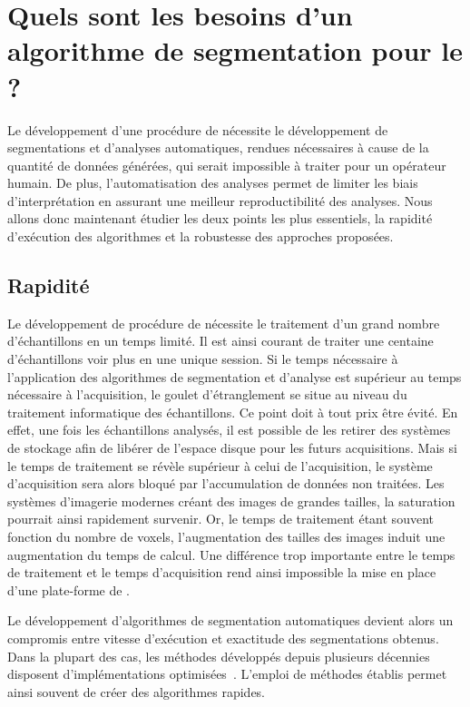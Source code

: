 \documentclass[\main/main.tex]{subfiles}
\begin{document}
            
\section{Quels sont les besoins d'un algorithme de segmentation pour le \hcs{}?}

%
Le développement d'une procédure de \hcs{} nécessite le développement de segmentations et d'analyses automatiques, rendues nécessaires à cause de la quantité de données générées, qui serait impossible à traiter pour un opérateur humain.
%
De plus, l'automatisation des analyses permet de limiter les biais d'interprétation en assurant une meilleur reproductibilité des analyses.
%
Nous allons donc maintenant étudier les deux points les plus essentiels,
la rapidité d'exécution des algorithmes et la robustesse des approches proposées.

    \subsection{Rapidité}
    
%
Le développement de procédure de \hcs{} nécessite le traitement d'un grand nombre d'échantillons en un temps limité.
%
Il est ainsi courant de traiter une centaine d'échantillons voir plus en une unique session.
%
Si le temps nécessaire à l'application des algorithmes de segmentation et d'analyse est supérieur au temps nécessaire à l'acquisition,
le goulet d'étranglement se situe au niveau du traitement informatique des échantillons.
%
Ce point doit à tout prix être évité. En effet, une fois les échantillons analysés, il est possible de les retirer des systèmes de stockage afin de libérer de l'espace disque pour les futurs acquisitions. Mais si le temps de traitement se révèle supérieur à celui de l'acquisition, le système d'acquisition sera alors bloqué par l'accumulation de données non traitées.
%
Les systèmes d'imagerie modernes créant des images de grandes tailles, la saturation pourrait ainsi rapidement survenir.
%
Or, le temps de traitement étant souvent fonction du nombre de voxels, l'augmentation des tailles des images induit une augmentation du temps de calcul.
%
Une différence trop importante entre le temps de traitement et le temps d'acquisition rend ainsi impossible la mise en place d'une plate-forme de \hcs{}.

%
Le développement d'algorithmes de segmentation automatiques devient alors un compromis entre vitesse d'exécution et exactitude des segmentations obtenus.
%
Dans la plupart des cas, les méthodes développés depuis plusieurs décennies disposent d'implémentations optimisées~\cite{vandroogenbroeck_1996,perreault_2007,trieu_2007}.
%
L'emploi de méthodes établis permet ainsi souvent de créer des algorithmes rapides.
\end{document}

